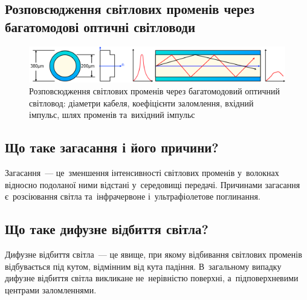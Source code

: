 \documentclass[
	a4paper,
	oneside,
	BCOR = 10mm,
	DIV = 12,
	12pt,
	headings = normal,
]{scrartcl}
\begin{document}
		\subsection{Розповсюдження світлових променів через багатомодові оптичні світловоди}
			\begin{figure}[!htbp]
				\centering
				\includegraphics[height = 4\baselineskip]{./assets/fibre-multimode.png}
				\caption{Розповсюдження світлових променів через багатомодовий оптичний світловод: діаметри кабеля, коефіцієнти заломлення, вхідний імпульс, шлях променів та~вихідний імпульс}
			\end{figure}

		\subsection{Що таке загасання і його причини?}
			Загасання~— це~зменшення інтенсивності світлових променів у~волокнах відносно подоланої ними відстані у~середовищі передачі. Причинами загасання є~розсіювання світла та~інфрачервоне і~ультрафіолетове поглинання.

		\subsection{Що таке дифузне відбиття світла?}
			Дифузне відбиття світла~— це явище, при якому відбивання світлових променів відбувається під кутом, відмінним від кута падіння. В~загальному випадку дифузне відбиття світла викликане не~нерівністю поверхні, а~підповерхневими центрами заломленнями.
\end{document}
